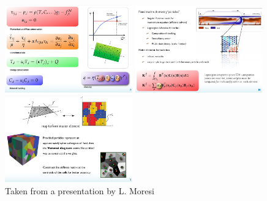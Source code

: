 \begin{itemize}
\begin{center}
\includegraphics[width=5.5cm]{images/codes/underworld1}
\includegraphics[width=5.5cm]{images/codes/underworld2}
\includegraphics[width=5.5cm]{images/codes/underworld3}\\
{\captionfont Taken from a presentation by L. Moresi}
\end{center}



\end{itemize}
